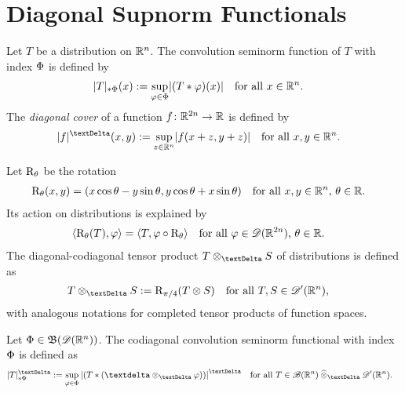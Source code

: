 \section{Diagonal Supnorm Functionals}
\label{dsnf}


Let $ T $ be a distribution on $ \mathbb{ R }^n $.
The convolution seminorm function of $ T $
with index $ \Phi $ is defined by \cite{KH022a,KH023,kle024}
\begin{align}
    \lvert  T  \rvert_{ \mathbin{*} \Phi }( x )
    &:=
    \sup_{\varphi\in\Phi}\lvert  ( T * \varphi )( x )  \rvert
    &&\text{for all $ x \in \mathbb{ R }^n $.}
\end{align}
The {\em diagonal cover} of a function $ f \colon \mathbb{ R }^{2n} \to \mathbb{ R } $
is defined by
\begin{align}
    \absDi{ f }( x, y )
    :=
    \sup_{z\in\nrR^n}\abs{ f( x + z, y + z ) }
    &&&\text{for all $ x, y \in \nrR^n $.}
\end{align}

Let $ \mathrm{ R }_{\theta} $ be the rotation
\begin{align}
    \mathrm{ R }_{\theta}( x, y )
    &=
    ( x\cos\theta - y\sin\theta, y\cos\theta + x\sin\theta )
    &&\text{for all $ x,y \in \mathbb{ R }^n $, $ \theta \in \mathbb{ R } $.}
\end{align}
Its action on distributions is explained by
\begin{align}
    \langle  \mathrm{ R }_\theta( T )  ,  \varphi  \rangle
    &=
    \langle  T  ,  \varphi \circ \mathrm{ R }_\theta  \rangle
    &&\text{for all $ \varphi \in \mathscr{  D  }( \mathbb{ R }^{2n} ) $, $ \theta \in \mathbb{ R } $.}
\end{align}
The diagonal-codiagonal tensor product $ T \teproDi S $
of distributions is defined as
\begin{align}
    T \teproDi S
    &:=
    \rmR_{\pi/4}( T \tepro S )
    &&\text{for all $ T, S \in \fsDis( \nrR^n ) $,}
\end{align}
with analogous notations for completed tensor products of function spaces.

\begin{definition}
    Let $ \Phi \in \operatorname{\mathfrak{ B }}( \mathscr{  D  }( \mathbb{ R }^n ) ) $.
    The codiagonal convolution seminorm functional with index $ \Phi $
    is defined as 
    \begin{align}
        \snfDiCo{ T }{ \Ph }
        &:=
        \sup_{ \ph \in \Ph }\AbsDi{ ( T * ( \sfdeo \teproDi \ph ) ) }
        &&\text{for all $ T \in \fsSmobnd(\nrR^n) \cteproDi \fsDis(\nrR^n) $.}
        \label{eq:snfDiCo}
    \end{align}
\end{definition}

